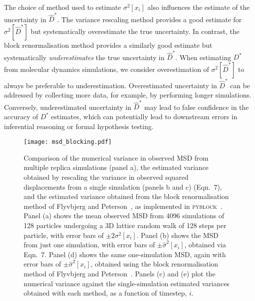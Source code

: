 \documentclass[reprint,superscriptaddress,nobibnotes,amsmath,amssymb,aps,prx,hidelinks]{revtex4-2}
\newcommand{\oMSDi}{\ensuremath{x_i}}
\newcommand{\Dest}{\ensuremath{\widehat{D}^*}}
\newcommand{\D}{\ensuremath{D^*}}
\newcommand{\var}[1]{\ensuremath{\sigma^2[#1]}}
\newcommand{\varest}[1]{\ensuremath{\widehat{\sigma}^2[#1]}}
\begin{document}
The choice of method used to estimate $\var{\oMSDi}$ also influences the estimate of the uncertainty in $\Dest$.
The variance rescaling method provides a good estimate for $\var{\Dest}$ but systematically overestimate the true uncertainty.
In contrast, the block renormalisation method provides a similarly good estimate but systematically \emph{underestimates} the true uncertainty in $\Dest$.
When estimating $\D$ from molecular dynamics simulations, we consider overestimation of $\var{\Dest}$ to always be preferable to underestimation.
Overestimated uncertainty in $\Dest$ can be addressed by collecting more data, for example, by performing longer simulations.
Conversely, underestimated uncertainty in $\Dest$ may lead to false confidence in the accuracy of $\D$ estimates, which can potentially lead to downstream errors in inferential reasoning or formal hypothesis testing.

\begin{figure*}[tb]
  \centering
  \texttt{[image: msd\_blocking.pdf]}
    \caption{\label{fig:msd_blocking_comparison}Comparison of the numerical variance in observed MSD from multiple replica simulations (panel a), the estimated variance obtained by rescaling the variance in observed squared displacements from a single simulation (panels b and c) (Eqn.~7), and the estimated variance obtained from the block renormalisation method of Flyvbjerg and Peterson~\cite{FlyvbjergAndPetersen_JChemPhys1989}, as implemented in \textsc{pyblock}~\cite{spencer_pyblock_2020}. Panel (a) shows the mean observed MSD from \num{4096} simulations of \num{128} particles undergoing a 3D lattice random walk of 128 steps per particle, with error bars of $\pm2\var{\oMSDi}$. Panel (b) shows the MSD from just one simulation, with error bars of $\pm\varest{\oMSDi}$, obtained via Eqn.~7. Panel (d) shows the same one-simulation MSD, again with error bars of $\pm\varest{\oMSDi}$, obtained using the block renormalisation method of Flyvbjerg and Peterson~\cite{FlyvbjergAndPetersen_JChemPhys1989}. Panels (c) and (e) plot the numerical variance against the single-simulation estimated variances obtained with each method, as a function of timestep, $i$.}
\end{figure*}
\end{document}
